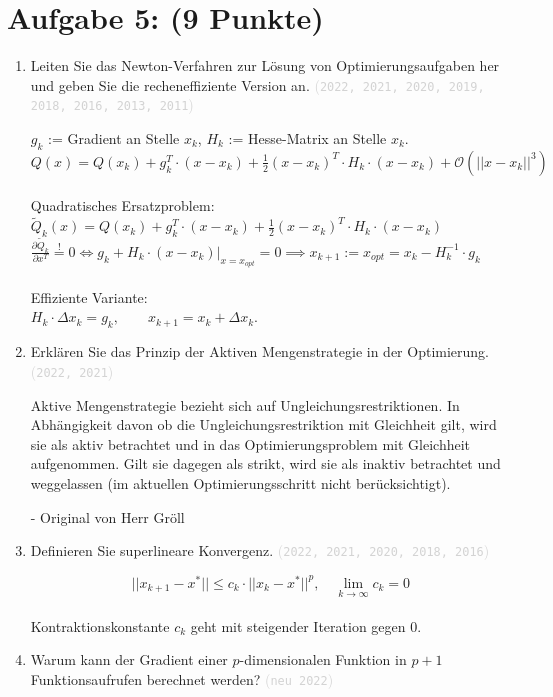 \documentclass[12pt]{article}
\newcommand{\kommentarMacro}[1]{\textcolor{lightgray}{(\texttt{#1})}}
\begin{document}
\section*{Aufgabe 5: (9 Punkte)}
\begin{enumerate}
    \item Leiten Sie das Newton-Verfahren zur Lösung von Optimierungsaufgaben her und geben Sie die recheneffiziente Version an. \kommentarMacro{2022, 2021, 2020, 2019, 2018, 2016, 2013, 2011}
          \begin{solution}
              $g_k$ := Gradient an Stelle $x_k$, $H_k$ := Hesse-Matrix an Stelle $x_k$.\\
              $Q(x) = Q(x_k) + g_k^T\cdot (x-x_k) + \frac{1}{2} (x-x_k)^T\cdot H_k \cdot (x-x_k) + \mathcal{O}\left(||x-x_k||^3\right)$\\\\
              Quadratisches Ersatzproblem:\\
              $\widetilde{Q}_k(x) = Q(x_k) + g_k^T\cdot (x-x_k) + \frac{1}{2} (x-x_k)^T\cdot H_k \cdot (x-x_k)$\\
              $\frac{\partial \widetilde{Q}_k}{\partial x^T} \stackrel{!}{=} 0 \iff g_k + H_k\cdot (x-x_k)|_{x=x_{opt}} = 0 \implies x_{k+1} := x_{opt} = x_k - H_k^{-1}\cdot g_k$\\\\
              Effiziente Variante:\\
              $H_k\cdot \Delta x_k = g_k, \qquad x_{k+1} = x_k + \Delta x_k $.
          \end{solution}

    \item Erklären Sie das Prinzip der Aktiven Mengenstrategie in der Optimierung. \\ \kommentarMacro{2022, 2021}

          \begin{solution}
              Aktive Mengenstrategie bezieht sich auf Ungleichungsrestriktionen. In Abhängigkeit davon ob die Ungleichungsrestriktion mit Gleichheit gilt, wird sie als aktiv betrachtet und in das Optimierungsproblem mit Gleichheit aufgenommen. Gilt sie dagegen als strikt, wird sie als inaktiv betrachtet und weggelassen (im aktuellen Optimierungsschritt nicht berücksichtigt).

              - Original von Herr Gröll
          \end{solution}
    \item Definieren Sie superlineare Konvergenz. \kommentarMacro{2022, 2021, 2020, 2018, 2016}
          \begin{solution}
              $$||x_{k+1} - x^{*}|| \leq c_k \cdot ||x_k - x^{*}||^p, \quad \lim_{k \rightarrow \infty} c_k = 0$$ \\
              Kontraktionskonstante $c_k$ geht mit steigender Iteration gegen 0.
          \end{solution}
    \item Warum kann der Gradient einer $p$-dimensionalen Funktion in $p+1$ Funktionsaufrufen berechnet werden? \kommentarMacro{neu 2022}


\end{enumerate}
\end{document}
